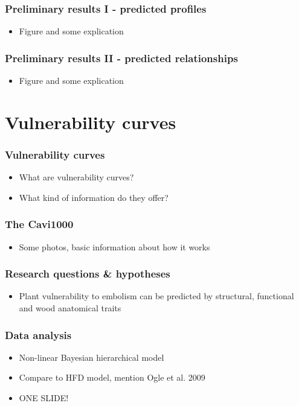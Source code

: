 \documentclass[usepdftitle=false]{beamer}
\begin{document}
\begin{frame}
	\frametitle{Preliminary results I - predicted profiles}
	\begin{itemize}
		\item Figure and some explication 
	\end{itemize}
\end{frame}

\begin{frame}
	\frametitle{Preliminary results II - predicted relationships}
	\begin{itemize}
		\item Figure and some explication 
	\end{itemize}
\end{frame}

\section{Vulnerability curves}
\begin{frame}
	\frametitle{Vulnerability curves}
	\begin{itemize}
		\item What are vulnerability curves?
		\item What kind of information do they offer?
	\end{itemize}  
\end{frame}

\begin{frame}
	\frametitle{The Cavi1000}
	\begin{itemize}
		\item Some photos, basic information about how it works
	\end{itemize}
\end{frame}

\begin{frame}
	\frametitle{Research questions \& hypotheses}
	\begin{itemize}
		\item Plant vulnerability to embolism can be predicted by structural, functional and wood anatomical traits
	\end{itemize}
\end{frame}

\begin{frame}
	\frametitle{Data analysis}
	\begin{itemize}
		\item Non-linear Bayesian hierarchical model
		\item Compare to HFD model, mention Ogle et al. 2009
		\item ONE SLIDE!
	\end{itemize}
\end{frame}
\end{document}
